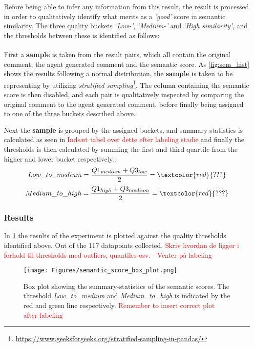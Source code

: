 Before being able to infer any information from this result, the result is processed in order to qualitatively identify what merits as a \textit{'good'} score in semantic similarity. The three quality buckets \textit{'Low-'}, \textit{'Medium-'} and \textit{'High similarity'}, and the thresholds between these is identified as follows:
\\\\
First a \textbf{sample} is taken from the result pairs, which all contain the original comment, the agent generated comment and the semantic score. As \cref{fig:sem_hist} shows the results following a normal distribution, the \textbf{sample} is taken to be representing by utilizing \textit{stratified sampling}\footnote{\url{https://www.geeksforgeeks.org/stratified-sampling-in-pandas/}}. The column containing the semantic score is then disabled, and each pair is qualitatively inspected by comparing the original comment to the agent generated comment, before finally being assigned to one of the three buckets described above. 

Next the \textbf{sample} is grouped by the assigned buckets, and summary statistics is calculated as seen in \textcolor{red}{Indsæt tabel over dette efter labeling stadie} and finally the thresholds is then calculated by summing the first and third quartile from the higher and lower bucket respectively.:
\[
Low\_to\_medium = \frac{Q1_{medium}+Q3_{low}}{2} = \textcolor{red}{???}
\]
\[
Medium\_to\_high = \frac{Q1_{high}+Q3_{medium}}{2} = \textcolor{red}{???}
\]

\subsubsection{Results}
In \cref{fig:sem_box} the results of the experiment is plotted against the quality thresholds identified above. Out of the 117 datapoints collected, \textcolor{red}{Skriv hvordan de ligger i forhold til thresholds med outliers, quantiles osv. - Venter på labeling}

\label{sec:sem_results}
\begin{figure}[H]
\centering
\texttt{[image: Figures/semantic\_score\_box\_plot.png]}
\caption{Box plot showing the summary-statistics of the semantic scores. The threshold \textit{Low\_to\_medium} and \textit{Medium\_to\_high} is indicated by the red and green line respectively. \textcolor{red}{Remember to insert correct plot after labeling}}
\label{fig:sem_box}
\end{figure}

